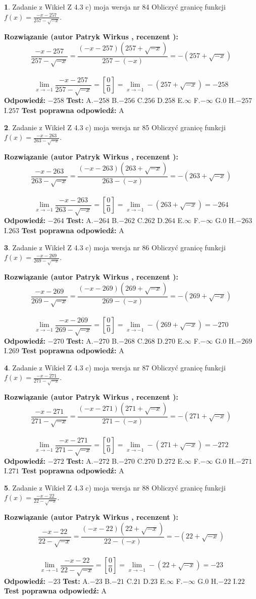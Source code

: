 \documentclass[12pt, a4paper]{article}
\theoremstyle{definition} %
\newtheorem{zad}{}
\newcommand{\zadStart}[1]{\begin{zad}#1\newline}
\newcommand{\zadStop}{\end{zad}}
\newcommand{\rozwStart}[2]{\noindent \textbf{Rozwiązanie (autor #1 , recenzent #2): }\newline}
\newcommand{\rozwStop}{\newline}
\newcommand{\odpStart}{\noindent \textbf{Odpowiedź:}\newline}
\newcommand{\odpStop}{\newline}
\newcommand{\testStart}{\noindent \textbf{Test:}\newline}
\newcommand{\testStop}{\newline}
\newcommand{\kluczStart}{\noindent \textbf{Test poprawna odpowiedź:}\newline}
\newcommand{\kluczStop}{\newline}
\begin{document}
\zadStart{Zadanie z Wikieł Z 4.3 c) moja wersja nr 84}
Obliczyć granicę funkcji $f(x)=\frac{-x-257}{257-\sqrt{-x}}$.
\zadStop
\rozwStart{Patryk Wirkus}{}
$$\frac{-x-257}{257-\sqrt{-x}}=\frac{(-x-257)(257+\sqrt{-x})}{257-(-x)}=-(257+\sqrt{-x})$$
\\
$$\lim\limits_{x\to-1}\frac{-x-257}{257-\sqrt{-x}}=[\frac{0}{0}]=\lim\limits_{x\to-1}-(257+\sqrt{-x}) =-258$$
\rozwStop
\odpStart
$-258$
\odpStop
\testStart
A.$-258$
B.$-256$
C.$256$
D.$258$
E.$\infty$
F.$-\infty$
G.$0$
H.$-257$
I.$257$
\testStop
\kluczStart
A
\kluczStop



\zadStart{Zadanie z Wikieł Z 4.3 c) moja wersja nr 85}
Obliczyć granicę funkcji $f(x)=\frac{-x-263}{263-\sqrt{-x}}$.
\zadStop
\rozwStart{Patryk Wirkus}{}
$$\frac{-x-263}{263-\sqrt{-x}}=\frac{(-x-263)(263+\sqrt{-x})}{263-(-x)}=-(263+\sqrt{-x})$$
\\
$$\lim\limits_{x\to-1}\frac{-x-263}{263-\sqrt{-x}}=[\frac{0}{0}]=\lim\limits_{x\to-1}-(263+\sqrt{-x}) =-264$$
\rozwStop
\odpStart
$-264$
\odpStop
\testStart
A.$-264$
B.$-262$
C.$262$
D.$264$
E.$\infty$
F.$-\infty$
G.$0$
H.$-263$
I.$263$
\testStop
\kluczStart
A
\kluczStop



\zadStart{Zadanie z Wikieł Z 4.3 c) moja wersja nr 86}
Obliczyć granicę funkcji $f(x)=\frac{-x-269}{269-\sqrt{-x}}$.
\zadStop
\rozwStart{Patryk Wirkus}{}
$$\frac{-x-269}{269-\sqrt{-x}}=\frac{(-x-269)(269+\sqrt{-x})}{269-(-x)}=-(269+\sqrt{-x})$$
\\
$$\lim\limits_{x\to-1}\frac{-x-269}{269-\sqrt{-x}}=[\frac{0}{0}]=\lim\limits_{x\to-1}-(269+\sqrt{-x}) =-270$$
\rozwStop
\odpStart
$-270$
\odpStop
\testStart
A.$-270$
B.$-268$
C.$268$
D.$270$
E.$\infty$
F.$-\infty$
G.$0$
H.$-269$
I.$269$
\testStop
\kluczStart
A
\kluczStop



\zadStart{Zadanie z Wikieł Z 4.3 c) moja wersja nr 87}
Obliczyć granicę funkcji $f(x)=\frac{-x-271}{271-\sqrt{-x}}$.
\zadStop
\rozwStart{Patryk Wirkus}{}
$$\frac{-x-271}{271-\sqrt{-x}}=\frac{(-x-271)(271+\sqrt{-x})}{271-(-x)}=-(271+\sqrt{-x})$$
\\
$$\lim\limits_{x\to-1}\frac{-x-271}{271-\sqrt{-x}}=[\frac{0}{0}]=\lim\limits_{x\to-1}-(271+\sqrt{-x}) =-272$$
\rozwStop
\odpStart
$-272$
\odpStop
\testStart
A.$-272$
B.$-270$
C.$270$
D.$272$
E.$\infty$
F.$-\infty$
G.$0$
H.$-271$
I.$271$
\testStop
\kluczStart
A
\kluczStop



\zadStart{Zadanie z Wikieł Z 4.3 c) moja wersja nr 88}
Obliczyć granicę funkcji $f(x)=\frac{-x-22}{22-\sqrt{-x}}$.
\zadStop
\rozwStart{Patryk Wirkus}{}
$$\frac{-x-22}{22-\sqrt{-x}}=\frac{(-x-22)(22+\sqrt{-x})}{22-(-x)}=-(22+\sqrt{-x})$$
\\
$$\lim\limits_{x\to-1}\frac{-x-22}{22-\sqrt{-x}}=[\frac{0}{0}]=\lim\limits_{x\to-1}-(22+\sqrt{-x}) =-23$$
\rozwStop
\odpStart
$-23$
\odpStop
\testStart
A.$-23$
B.$-21$
C.$21$
D.$23$
E.$\infty$
F.$-\infty$
G.$0$
H.$-22$
I.$22$
\testStop
\kluczStart
A
\kluczStop
\end{document}
